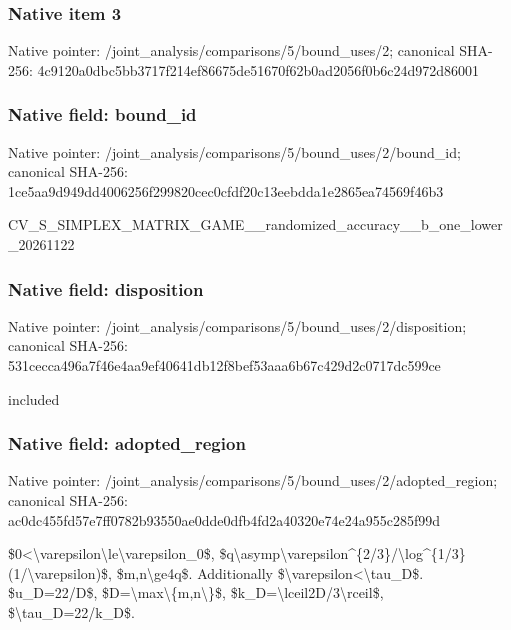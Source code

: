 \documentclass[10pt,a4paper]{article}
\begin{document}
\subsubsection{Native item 3}


Native pointer: /joint\_analysis/comparis\allowbreak{}ons/5/bound\_uses/2; canonical SHA-256: 4c9120a0dbc5bb3717f214ef\allowbreak{}86675de51670f62b0ad2056f\allowbreak{}0b6c24d972d86001



\subsubsection{Native field: bound\_id}


Native pointer: /joint\_analysis/comparis\allowbreak{}ons/5/bound\_uses/2/bound\allowbreak{}\_id; canonical SHA-256: 1ce5aa9d949dd4006256f299\allowbreak{}820cec0cfdf20c13eebdda1e\allowbreak{}2865ea74569f46b3


CV\_S\_SIMPLEX\_MATRIX\_GAME\allowbreak{}\_\_randomized\_accuracy\_\_b\allowbreak{}\_one\_lower\_20261122


\subsubsection{Native field: disposition}


Native pointer: /joint\_analysis/comparis\allowbreak{}ons/5/bound\_uses/2/dispo\allowbreak{}sition; canonical SHA-256: 531cecca496a7f46e4aa9ef4\allowbreak{}0641db12f8bef53aaa6b67c4\allowbreak{}29d2c0717dc599ce


included


\subsubsection{Native field: adopted\_region}


Native pointer: /joint\_analysis/comparis\allowbreak{}ons/5/bound\_uses/2/adopt\allowbreak{}ed\_region; canonical SHA-256: ac0dc455fd57e7ff0782b935\allowbreak{}50ae0dde0dfb4fd2a40320e7\allowbreak{}4e24a955c285f99d


\$0<\textbackslash{}varepsilon\textbackslash{}le\textbackslash{}varepsilon\_0\$, \$q\textbackslash{}asymp\textbackslash{}varepsilon\textasciicircum{}\{2/\allowbreak{}3\}/\textbackslash{}log\textasciicircum{}\{1/3\}(1/\textbackslash{}varepsi\allowbreak{}lon)\$, \$m,n\textbackslash{}ge4q\$. Additionally \$\textbackslash{}varepsilon<\textbackslash{}tau\_D\$. \$u\_D=22/D\$, \$D=\textbackslash{}max\textbackslash{}\{m,n\textbackslash{}\}\$, \$k\_D=\textbackslash{}lceil2D/3\textbackslash{}rceil\$, \$\textbackslash{}tau\_D=22/k\_D\$.
\end{document}

